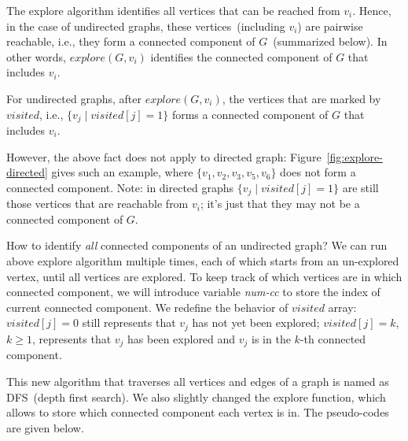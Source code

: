 The explore algorithm identifies all vertices that can be reached from $v_i$.
Hence, in the case of undirected graphs, these vertices~(including $v_i$) are pairwise reachable, 
i.e., they form a connected component of $G$~(summarized below). In other words,
$explore(G,v_i)$ identifies the connected component of $G$ that includes $v_i$.

\begin{fact}
For undirected graphs, after $explore(G, v_i)$, the vertices that are marked by $visited$, i.e.,
$\{v_j \mid visited[j] = 1\}$ forms a connected component of $G$ that includes $v_i$.
\end{fact}

However, the above fact does not apply to directed graph: Figure~\ref{fig:explore-directed} gives such an example,
where $\{v_1,v_2,v_3,v_5,v_6\}$ does not form a connected component. Note: in directed graphs
$\{v_j \mid visited[j] = 1\}$ are still those vertices that are reachable from $v_i$; it's just that
they may not be a connected component of $G$.

How to identify \emph{all} connected components of an undirected graph?
We can run above explore algorithm multiple times, each of which starts from an un-explored vertex,
until all vertices are explored. To keep track of which vertices are in which connected
component, we will introduce variable \emph{num-cc} to store the index of current connected component.
We redefine the behavior of $visited$ array: $visited[j] = 0$ still represents that $v_j$ has not yet been explored;
$visited[j] = k$, $k\ge 1$, represents that $v_j$ has been explored and $v_j$ is in the $k$-th connected component.

This new algorithm that traverses all vertices and edges of a graph is named as DFS~(depth first search).
We also slightly changed the explore function, which allows to store which connected component each vertex is in.
The pseudo-codes are given below.

\begin{minipage}{0.8\textwidth}
	\xxx
	\xxx
	\xxx
	\xxx
	\xxx
	\xxx
	\xxx
	\xxx
	\xxx
	\xxx
\end{minipage}


\begin{minipage}{0.8\textwidth}
	\xxx
	\xxx
	\xxx
	\xxx
	\xxx
	\xxx
\end{minipage}

